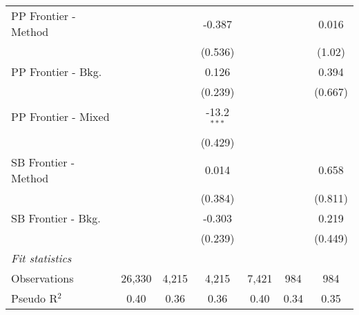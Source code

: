 \begin{tabular}{lcccccc}
   PP Frontier - Method &               &         & -0.387        &         &         & 0.016\\   
                        &               &         & (0.536)       &         &         & (1.02)\\   
   PP Frontier - Bkg.   &               &         & 0.126         &         &         & 0.394\\   
                        &               &         & (0.239)       &         &         & (0.667)\\   
   PP Frontier - Mixed  &               &         & -13.2$^{***}$ &         &         &   \\   
                        &               &         & (0.429)       &         &         &   \\   
   SB Frontier - Method &               &         & 0.014         &         &         & 0.658\\   
                        &               &         & (0.384)       &         &         & (0.811)\\   
   SB Frontier - Bkg.   &               &         & -0.303        &         &         & 0.219\\   
                        &               &         & (0.239)       &         &         & (0.449)\\   
   \midrule
   \emph{Fit statistics}\\
   Observations         & 26,330        & 4,215   & 4,215         & 7,421   & 984     & 984\\  
   Pseudo R$^2$         & 0.40          & 0.36    & 0.36          & 0.40    & 0.34    & 0.35\\  
   

\end{tabular}
